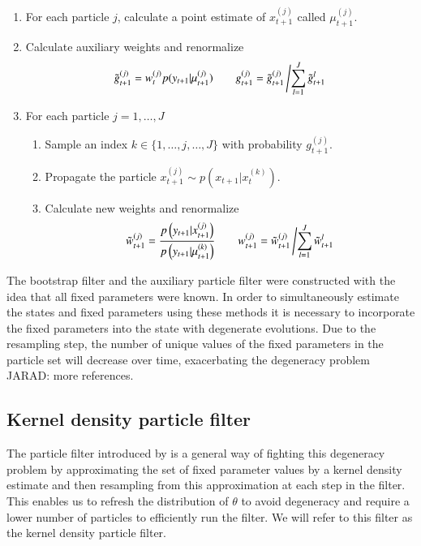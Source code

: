 \documentclass{elsarticle}
\newcommand{\jarad}[1]{{\color{red}JARAD: #1}}
\begin{document}
\begin{enumerate}
\item For each particle $j$, calculate a point estimate of $x_{t+1}^{(j)}$ called $\mu_{t+1}^{(j)}$.  %
\item Calculate auxiliary weights and renormalize
\[ \tilde{g}_{t+1}^{(j)} = w_t^{(j)} p(y_{t+1}|\mu_{t+1}^{(j)}) \qquad g_{t+1}^{(j)} = \tilde{g}_{t+1}^{(j)}\left/\sum_{l=1}^J \tilde{g}_{t+1}^l\right. \]
\item For each particle $j=1,\ldots,J$
	\begin{enumerate}
	\item Sample an index $k\in\{1,\ldots,j,\ldots,J\}$ with probability $g_{t+1}^{(j)}$.
	\item Propagate the particle $x_{t+1}^{(j)}\sim p\left(x_{t+1}|x_t^{(k)}\right)$.
	\item Calculate new weights and renormalize
\[\tilde{w}_{t+1}^{(j)} = \frac{p\left(y_{t+1}|x_{t+1}^{(j)}\right)}{p\left(y_{t+1}|\mu_{t+1}^{(k)}\right)} \qquad w_{t+1}^{(j)} = \tilde{w}_{t+1}^{(j)}\left/\sum_{l=1}^J \tilde{w}_{t+1}^l \right.\]
	\end{enumerate}
\end{enumerate}

The bootstrap filter and the auxiliary particle filter were constructed with the idea that all fixed parameters were known. In order to simultaneously estimate the states and fixed parameters using these methods it is necessary to incorporate the fixed parameters into the state with degenerate evolutions. Due to the resampling step, the number of unique values of the fixed parameters in the particle set will decrease over time, exacerbating the degeneracy problem \citep{Liu:West:comb:2001} \jarad{more references}.

\subsection{Kernel density particle filter} \label{sec:kd}

The particle filter introduced by \cite{Liu:West:comb:2001} is a general way of fighting this degeneracy problem by approximating the set of fixed parameter values by a kernel density estimate and then resampling from this approximation at each step in the filter. This enables us to refresh the distribution of $\theta$ to avoid degeneracy and require a lower number of particles to efficiently run the filter. We will refer to this filter as the kernel density particle filter.
\end{document}
